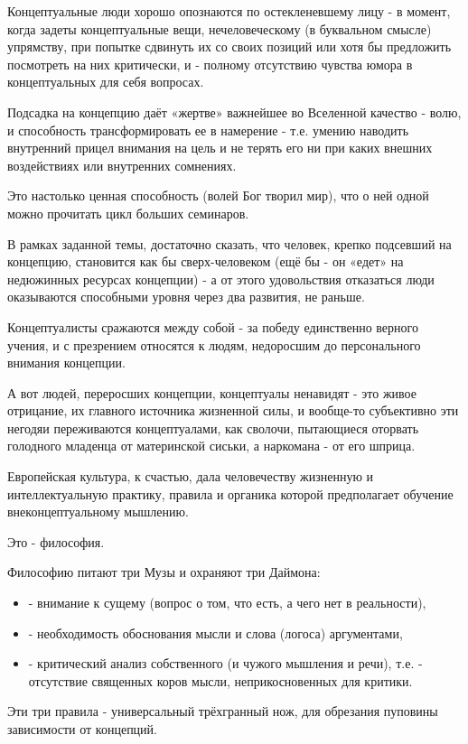 Концептуальные люди хорошо опознаются по остекленевшему лицу - в момент, когда
задеты концептуальные вещи, нечеловеческому (в буквальном смысле) упрямству,
при попытке сдвинуть их со своих позиций или хотя бы предложить посмотреть на
них критически, и - полному отсутствию чувства юмора в концептуальных для себя
вопросах. 

Подсадка на концепцию даёт «жертве» важнейшее во Вселенной качество - волю, и
способность трансформировать ее в намерение - т.е. умению наводить внутренний
прицел внимания на цель и не терять его ни при каких внешних воздействиях или
внутренних сомнениях.

Это настолько ценная способность (волей Бог творил мир), что о ней одной можно
прочитать цикл больших семинаров.

В рамках заданной темы, достаточно сказать, что человек, крепко подсевший на
концепцию, становится как бы сверх-человеком (ещё бы - он «едет» на недюжинных
ресурсах концепции) - а от этого удовольствия отказаться люди оказываются
способными уровня через два развития, не раньше.

Концептуалисты сражаются между собой - за победу единственно верного учения, и
с презрением относятся к людям, недоросшим до персонального внимания концепции.

А вот людей, переросших концепции, концептуалы ненавидят - это живое отрицание,
их главного источника жизненной силы, и вообще-то субъективно эти негодяи
переживаются концептуалами, как сволочи, пытающиеся оторвать голодного младенца
от материнской сиськи, а наркомана - от его шприца.

Европейская культура, к счастью, дала человечеству жизненную и интеллектуальную
практику, правила и органика которой предполагает обучение внеконцептуальному
мышлению.

Это - философия.

Философию питают три Музы и охраняют три Даймона:

\begin{itemize}
\item - внимание к сущему (вопрос о том, что есть, а чего нет в реальности),
\item - необходимость обоснования мысли и слова (логоса) аргументами, 
\item - критический анализ собственного (и чужого мышления и речи), т.е. - отсутствие
священных коров мысли, неприкосновенных для критики.
\end{itemize}

Эти три правила - универсальный трёхгранный нож, для  обрезания пуповины
зависимости от концепций. 

